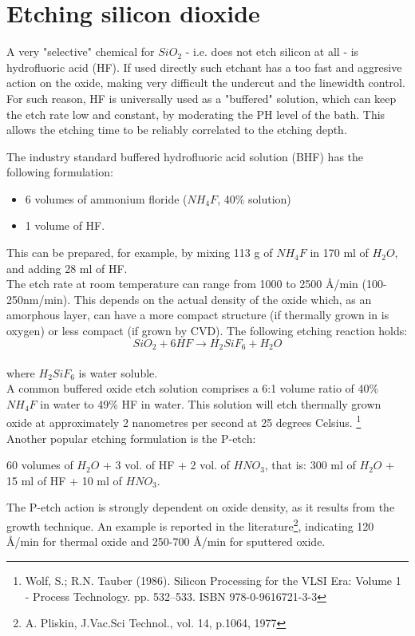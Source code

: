 \section{Etching silicon dioxide}
A very "selective" chemical for $SiO_2$ - i.e. does not etch silicon at all - is hydrofluoric acid (HF). If used directly such etchant has a too fast and aggresive action on the oxide, making very difficult the undercut and the linewidth control. For such reason, HF is universally used as a "buffered" solution, which can keep the etch rate low and constant, by moderating the PH level of the bath. This allows the etching time to be reliably correlated to the etching depth.

The industry standard buffered hydrofluoric acid solution (BHF\label{BHF}) has the following formulation:
\begin{itemize}
	\item 6 volumes of ammonium floride ($NH_4F$, 40\% solution)
	\item 1 volume of HF.
\end{itemize}
This can be prepared, for example, by mixing 113 g of $NH_4F$ in 170 ml of $H_2O$, and adding 28 ml of HF.\\
The etch rate at room temperature can range from 1000 to 2500 \r{A}/min (100-250nm/min).
This depends on the actual density of the oxide which, as an amorphous layer, can have a more compact structure (if thermally grown in is oxygen) or less compact (if grown by CVD).
The following etching reaction holds:
\begin{equation}
	SiO_2 + 6HF \rightarrow H_2SiF_6 + H_2O
\end{equation}\\
where $H_2SiF_6$ is water soluble.\\
A common buffered oxide etch solution comprises a 6:1 volume ratio of 40\% $NH_4F$ in water to 49\% HF in water. This solution will etch thermally grown oxide at approximately 2 nanometres per second at 25 degrees Celsius.\label{BHF_six_to_one}
\footnote{Wolf, S.; R.N. Tauber (1986). Silicon Processing for the VLSI Era: Volume 1 - Process Technology. pp. 532–533. ISBN 978-0-9616721-3-3} \\

Another popular etching formulation is the P-etch:

60 volumes of $H_2O$ + 3 vol. of HF + 2 vol. of $HNO_3$, that is: 300 ml of $H_2O$ + 15 ml of HF + 10 ml of $HNO_3$.

The P-etch action is strongly dependent on oxide density, as it results from the growth technique.
An example is reported in the literature\footnote{A. Pliskin, J.Vac.Sci Technol., vol. 14, p.1064, 1977}, indicating 120 \r{A}/min for thermal oxide and 250-700 \r{A}/min for sputtered oxide.

